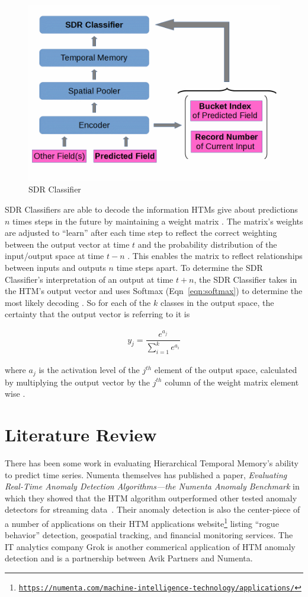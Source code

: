 \documentclass[oneside,12pt,openany]{book}
\begin{document}
	\begin{figure}[hbt!]
		\centering
		\includegraphics[width=.6\linewidth]{images/SDRClassifier.jpg}
		\caption{SDR Classifier}
		\label{fig:SDRClassifier}
	\end{figure}
	
	SDR Classifiers are able to decode the information HTMs give about predictions $n$ times steps in the future by maintaining a weight matrix \cite{Dillon}. The matrix's weights are adjusted to ``learn'' after each time step to reflect the correct weighting between the output vector at time $t$ and the probability distribution of the input/output space at time $t-n$ \cite{Dillon}. This enables the matrix to reflect relationships between inputs and outputs $n$ time steps apart. To determine the SDR Classifier's interpretation of an output at time $t+n$, the SDR Classifier takes in the HTM's output vector and uses Softmax (Eqn~\ref{eqn:softmax}) to determine the most likely decoding \cite{Dillon}. So for each of the $k$ classes in the output space, the certainty that the output vector is referring to it is 
	
	\begin{align}
	\label{eqn:softmax}
	y_{j} = \dfrac{e^{a_{j}}}{\sum_{i=1}^{k} e^{a_{i}}}
	\end{align}
	
	
	 \noindent where $a_{j}$ is the activation level of the $j^{th}$ element of the output space, calculated by multiplying the output vector by the $j^{th}$ column of the weight matrix element wise \cite{Dillon}. 
	
	\chapter{Literature Review}\label{sec:lit}
	
	
	There has been some work in evaluating Hierarchical Temporal Memory's ability to predict time series. Numenta themselves has published a paper, \textit{Evaluating Real-Time Anomaly Detection Algorithms---the Numenta Anomaly Benchmark} in which they showed that the HTM algorithm outperformed other tested anomaly detectors for streaming data~\cite{NAB}. Their anomaly detection is also the center-piece of a number of applications on their HTM applications website\footnote{\href{https://numenta.com/machine-intelligence-technology/applications/}{\texttt{https://numenta.com/machine-intelligence-technology/applications/}}} listing ``rogue behavior'' detection, geospatial tracking, and financial monitoring services. The IT analytics company Grok is another commerical application of HTM anomaly detection and is a partnership between Avik Partners and Numenta.
	
\end{document}
